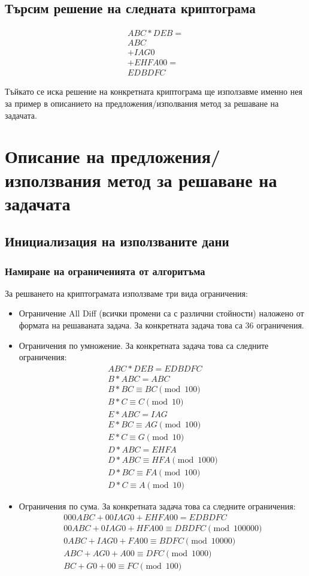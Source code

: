 \documentclass[a4paper, 12pt]{article}
\begin{document}
\subsection{Търсим решение на следната криптограма}
\begin{align*}
ABC * DEB = \\
ABC \\
+ IAG0 \\
+ EHFA00 = \\
EDBDFC
\end{align*}

Тъйкато се иска решение на конкретната криптограма ще използавме именно нея за пример в описанието
на предложения/изполвания метод за решаване на задачата.

\section{Описание на предложения/използвания метод за решаване на задачата}
\subsection{Инициализация на използваните дани}
\subsubsection{Намиране на ограниченията от алгоритъма}
За решването на криптограмата използваме три вида ограничения:
\begin{itemize}
\item Ограничение All Diff (всички промени са с различни стойности) наложено от формата на решаваната задача. 
За конкретната задача това са 36 ограничения.
\item Ограничения по умножение. За конкретната задача това са следните ограничения:
\begin{align*}
    ABC * DEB = EDBDFC \\
    B * ABC = ABC \\
    B * BC \equiv BC \pmod{100} \\
    B * C \equiv C \pmod{10} \\
    E * ABC = IAG \\
    E * BC \equiv AG \pmod{100} \\
    E * C \equiv G \pmod{10} \\
    D * ABC = EHFA \\
    D * ABC \equiv HFA \pmod{1000} \\
    D * BC \equiv FA \pmod{100} \\
    D * C \equiv A \pmod{10}
\end{align*}
\item Ограничения по сума. За конкретната задача това са следните ограничения:
\begin{align*}
    000ABC + 00IAG0 + EHFA00 = EDBDFC \\
    00ABC + 0IAG0 + HFA00 \equiv DBDFC \pmod{100000} \\
    0ABC + IAG0 + FA00 \equiv BDFC \pmod{10000} \\
    ABC + AG0 + A00 \equiv DFC \pmod{1000} \\
    BC + G0 + 00 \equiv FC \pmod{100}
\end{align*}
\end{itemize}
\end{document}

